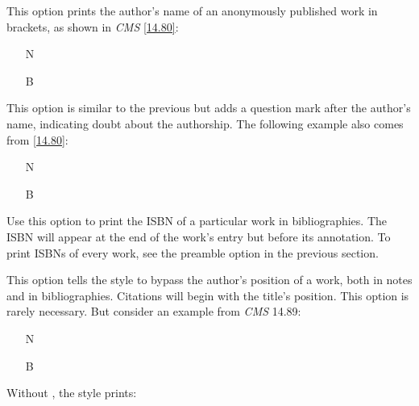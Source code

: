 \documentclass[11pt,letterpaper,oneside]{article}
\begin{document}
\begin{optionlist}


This option prints the author's name of an anonymously published work
in brackets, as shown in \textit{CMS} \ref{14.80}:

\begin{itemize}
\item[N] 

\item[B] 
\end{itemize}


This option is similar to the previous but adds a question mark after
the author's name, indicating doubt about the authorship. The
following example also comes from \ref{14.80}:

\begin{itemize}
\item[N] 

\item[B] 
\end{itemize}


Use this option to print the ISBN of a particular work in
bibliographies. The ISBN will appear at the end of the work's entry
but before its annotation. To print ISBNs of every work, see the
 preamble option in the previous section.


This option tells the style to bypass the author's position of a work,
both in notes and in bibliographies. Citations will begin with the
title's position. This option is rarely necessary. But consider an
example from \textit{CMS} 14.89:

\begin{itemize}
\item[N] 

\item[B] 
\end{itemize}

\noindent Without , the style prints:



\end{optionlist}
\end{document}
